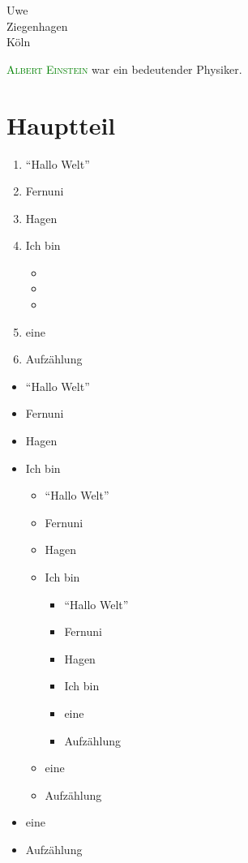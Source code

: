 \documentclass[12pt,ngerman,parskip=full]{scrreprt}
\newcommand{\person}[1]{\textsc{\textcolor{green}{#1}}}
\begin{document}
Uwe \\ Ziegenhagen \\ Köln

\person{Albert Einstein} war ein bedeutender Physiker.

\chapter{Hauptteil}\label{cha:hauptteil}

\begin{enumerate}
	\item \enquote{Hallo Welt}
	\item Fernuni
	\item Hagen
	\item Ich bin
	
	\begin{itemize}
		\item 
		\item 
		\item 
	\end{itemize}
	\item eine 
	\item Aufzählung
\end{enumerate}



\blindtext[2]  

\newpage

\begin{itemize}
	\item \enquote{Hallo Welt}
	\item Fernuni
	\item Hagen
	\item Ich bin
	
	\begin{itemize}
	\item \enquote{Hallo Welt}
	\item Fernuni
	\item Hagen
	\item Ich bin
	
	\begin{itemize}
	\item \enquote{Hallo Welt}
	\item Fernuni
	\item Hagen
	\item Ich bin
	\item eine 
	\item Aufzählung
\end{itemize}

	\item eine 
	\item Aufzählung
\end{itemize}
	
	
	\item eine 
	\item Aufzählung
\end{itemize}
\end{document}
